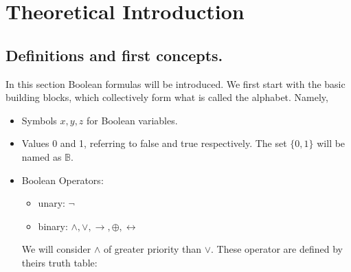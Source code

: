 
\chapter{Theoretical Introduction} %

\label{Chapter1} %


\newcommand{\keyword}[1]{\textbf{#1}}
\newcommand{\tabhead}[1]{\textbf{#1}}
\newcommand{\code}[1]{\texttt{#1}}
\newcommand{\file}[1]{\texttt{\bfseries#1}}
\newcommand{\option}[1]{\texttt{\itshape#1}}

\section{Definitions and first concepts.}
In this section Boolean formulas will be introduced. We first start with the basic building blocks, which collectively form what is called  the alphabet. Namely,
\begin{itemize}
\item Symbols $x,y,z$ for Boolean variables.
\item Values 0 and 1, referring to false  and true respectively. The set $\{0,1\}$ will be named as $\mathbb{B}$.

\item Boolean Operators: 
\begin{itemize}
	\item unary: $\neg $
	\item binary: $\wedge, \vee, \rightarrow, \oplus, \leftrightarrow $
\end{itemize}


We will consider $\wedge$ of greater priority than $\vee$. These operator are defined by theirs truth table:

\end{itemize}

